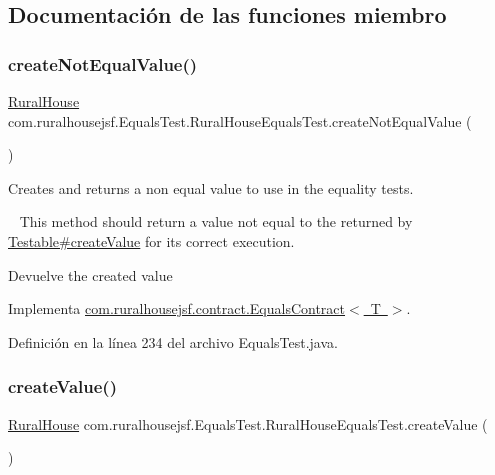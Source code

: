 \subsection{Documentación de las funciones miembro}
\mbox{\label{a00256_a4021dc1a2dacaed55fa5bacec7ca6165}} 
\subsubsection{\texorpdfstring{createNotEqualValue()}{createNotEqualValue()}}
{\footnotesize\ttfamily \mbox{\hyperlink{a00188}{Rural\+House}} com.\+ruralhousejsf.\+Equals\+Test.\+Rural\+House\+Equals\+Test.\+create\+Not\+Equal\+Value (\begin{DoxyParamCaption}{ }\end{DoxyParamCaption})}



Creates and returns a non equal value to use in the equality tests. 

~\newline
 This method should return a value not equal to the returned by \mbox{\hyperlink{}{Testable\#create\+Value}} for its correct execution.

\begin{DoxyReturn}{Devuelve}
the created value 
\end{DoxyReturn}


Implementa \mbox{\hyperlink{a00240_a65840509b57f6b89e42e2abf1978aa01}{com.\+ruralhousejsf.\+contract.\+Equals\+Contract$<$ T $>$}}.



Definición en la línea 234 del archivo Equals\+Test.\+java.

\mbox{\label{a00256_abcab55b3e63c8d5511f04e395ff0f111}} 
\subsubsection{\texorpdfstring{createValue()}{createValue()}}
{\footnotesize\ttfamily \mbox{\hyperlink{a00188}{Rural\+House}} com.\+ruralhousejsf.\+Equals\+Test.\+Rural\+House\+Equals\+Test.\+create\+Value (\begin{DoxyParamCaption}{ }\end{DoxyParamCaption})}



